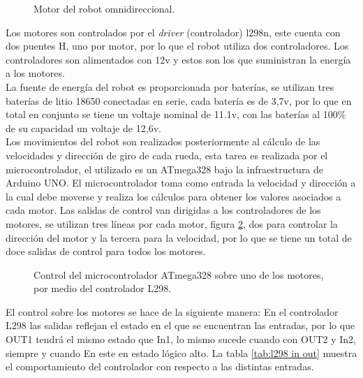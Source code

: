 \documentclass{iccmemoria}
\begin{document}
\begin{figure}[H]
  \centering
  
  \caption{Motor del robot omnidireccional.}
  \label{fig:motor}
\end{figure}

Los motores son controlados por el \emph{driver} (controlador) l298n, este cuenta con dos puentes H, uno por motor, por lo que el robot utiliza dos controladores. Los controladores son alimentados con 12v y estos son los que suministran la energía a los motores.\\

La fuente de energía del robot es proporcionada por baterías, se utilizan tres baterías de litio 18650 conectadas en serie, cada batería es de 3,7v, por lo que en total en conjunto se tiene un voltaje nominal de 11.1v, con las baterías al 100\% de su capacidad un voltaje de 12,6v.\\

Los movimientos del robot son realizados posteriormente al cálculo de las velocidades y dirección de giro de cada rueda, esta tarea es realizada por el microcontrolador, el utilizado es un ATmega328 bajo la infraestructura de Arduino UNO. El microcontrolador toma como entrada la velocidad y dirección a la cual debe moverse y realiza los cálculos para obtener los valores asociados a cada motor. Las salidas de control van dirigidas a los controladores de los motores, se utilizan tres líneas por cada motor, figura \ref{fig:ATmega328_L298}, dos para controlar la dirección del motor y la tercera para la velocidad, por lo que se tiene un total de doce salidas de control para todos los motores.\\

\begin{figure}[H]
  \centering
  \selectfont{
  
  }
  \caption{Control del microcontrolador ATmega328 sobre uno de los motores, por medio del controlador L298.}
  \label{fig:ATmega328_L298}
\end{figure}

El control sobre los motores se hace de la siguiente manera: En el controlador L298 las salidas reflejan el estado en el que se encuentran las entradas, por lo que OUT1 tendrá el mismo estado que In1, lo mismo sucede cuando con OUT2 y In2, siempre y cuando En este en estado lógico alto. La tabla \ref{tab:l298 in out} muestra el comportamiento del controlador con respecto a las distintas entradas.\\
\end{document}
